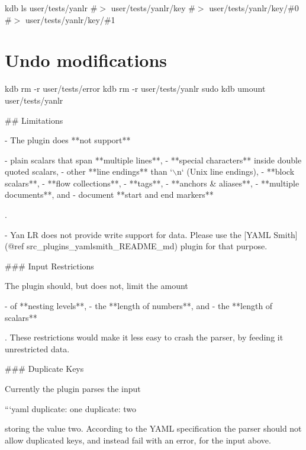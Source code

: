 kdb ls user/tests/yanlr \#$>$ user/tests/yanlr/key \#$>$ user/tests/yanlr/key/\#0 \#$>$ user/tests/yanlr/key/\#1\hypertarget{autotoc_md955_autotoc_md994}{}\section{Undo modifications}\label{autotoc_md955_autotoc_md994}
kdb rm -\/r user/tests/error kdb rm -\/r user/tests/yanlr sudo kdb umount user/tests/yanlr 
\begin{DoxyCode}
## Limitations

- The plugin does **not support**

  - plain scalars that span **multiple lines**,
  - **special characters** inside double quoted scalars,
  - other **line endings** than `\(\backslash\)n` (Unix line endings),
  - **block scalars**,
  - **flow collections**,
  - **tags**,
  - **anchors & aliases**,
  - **multiple documents**, and
  - document **start and end markers**

  .

- Yan LR does not provide write support for data. Please use the [YAML Smith](@ref
       src\_plugins\_yamlsmith\_README\_md) plugin for that purpose.

### Input Restrictions

The plugin should, but does not, limit the amount

- of **nesting levels**,
- the **length of numbers**, and
- the **length of scalars**

. These restrictions would make it less easy to crash the parser, by feeding it unrestricted data.

### Duplicate Keys

Currently the plugin parses the input

```yaml
duplicate: one
duplicate: two
\end{DoxyCode}


storing the value {\ttfamily two}. According to the Y\+A\+ML specification the parser should not allow duplicated keys, and instead fail with an error, for the input above.